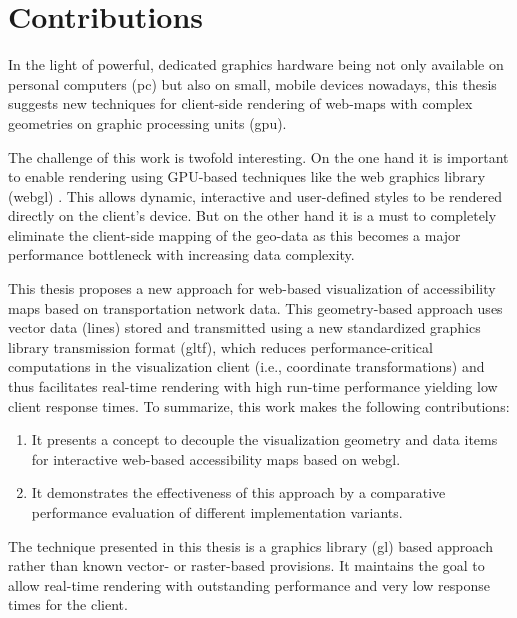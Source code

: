   \section{Contributions}
    \label{sec:intro:contr}

    In the light of powerful, dedicated graphics hardware being not only
    available on personal computers (\acrshort{pc}) but also
    on small, mobile devices nowadays, this thesis suggests new techniques for
    client-side rendering of web-maps with complex geometries on graphic
    processing units (\acrshort{gpu}).\par

    The challenge of this work is twofold interesting. On the one hand it is
    important to enable rendering using GPU-based techniques like
    the web graphics library (\acrshort{webgl}) \cite{Jackson2016}.
    This allows dynamic, interactive and user-defined styles to be rendered
    directly on the client's device. But on the other hand it is a must to
    completely eliminate the client-side mapping of the geo-data as this becomes
    a major performance bottleneck with increasing data complexity.\par

    This thesis proposes a new approach for web-based visualization of
    accessibility maps based on transportation network data. This geometry-based
    approach uses vector data (lines) stored and transmitted using a new
    standardized graphics library transmission format (\acrshort{gltf}), which
    reduces performance-critical
    computations in the visualization client (i.e., coordinate transformations)
    and thus facilitates real-time rendering with high run-time performance
    yielding low client response times. To summarize, this work makes the
    following contributions:

    \begin{enumerate}[\label=(C1)]
      \item It presents a concept to decouple the visualization geometry and
        data items for interactive web-based accessibility maps based on
        \acrshort{webgl}.
      \item It demonstrates the effectiveness of this approach by a
        comparative performance evaluation of different implementation
        variants.
    \end{enumerate}

    The technique presented in this thesis is a graphics library (\acrshort{gl})
    based
    approach rather than known vector- or raster-based provisions. It maintains
    the goal to allow real-time rendering with outstanding performance and very
    low response times for the client.\par

